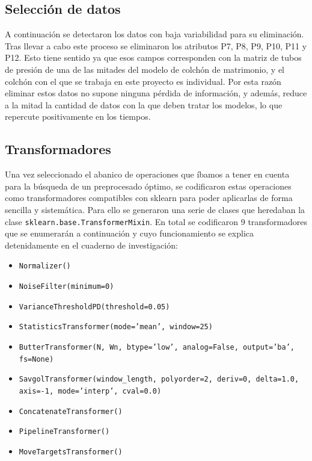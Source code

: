 \subsection{Selección de datos}

A continuación se detectaron los datos con baja variabilidad para su eliminación. Tras llevar a cabo este proceso se eliminaron los atributos P7, P8, P9, P10, P11 y P12. Esto tiene sentido ya que esos campos corresponden con la matriz de tubos de presión de una de las mitades del modelo de colchón de matrimonio, y el colchón con el que se trabaja en este proyecto es individual. Por esta razón eliminar estos datos no supone ninguna pérdida de información, y además, reduce a la mitad la cantidad de datos con la que deben tratar los modelos, lo que repercute positivamente en los tiempos. 

\subsection{Transformadores}

Una vez seleccionado el abanico de operaciones que íbamos a tener en cuenta para la búsqueda de un preprocesado óptimo, se codificaron estas operaciones como transformadores compatibles con sklearn para poder aplicarlas de forma sencilla y sistemática. Para ello se generaron una serie de clases que heredaban la clase \texttt{sklearn.base.TransformerMixin}. En total se codificaron 9 transformadores que se enumerarán a continuación y cuyo funcionamiento se explica detenidamente en el cuaderno de investigación: 

\begin{minipage}{\linewidth}
\begin{itemize}
	\item \texttt{Normalizer()}
	\item \texttt{NoiseFilter(minimum=0)}
	\item \texttt{VarianceThresholdPD(threshold=0.05)}
	\item \texttt{StatisticsTransformer(mode=’mean’, window=25)}
	\item \texttt{ButterTransformer(N, Wn, btype=’low’, analog=False, output=’ba’, fs=None)}
	\item \texttt{SavgolTransformer(window\_length, polyorder=2, deriv=0, delta=1.0, axis=-1, mode=’interp’, cval=0.0)}
	\item \texttt{ConcatenateTransformer()}
	\item \texttt{PipelineTransformer()}
	\item \texttt{MoveTargetsTransformer()}
\end{itemize}
\end{minipage}

